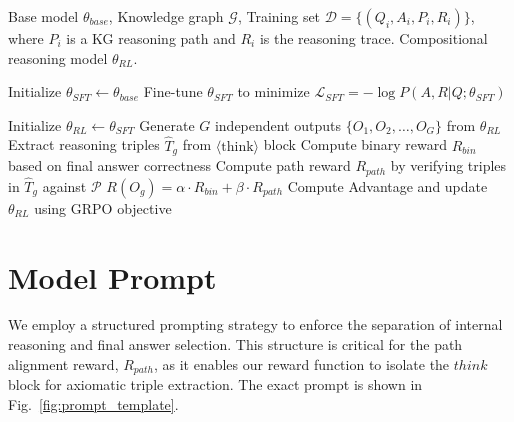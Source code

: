 \documentclass{article}
\theoremstyle{plain}
\theoremstyle{definition}
\theoremstyle{remark}
\begin{document}
\begin{algorithm}[h!]
   \caption{Grounded Compositional Reasoning Pipeline (SFT+RL)}
   \label{alg:pipeline}
\begin{algorithmic}
    Base model $\theta_{base}$, Knowledge graph $\mathcal{G}$, Training set $\mathcal{D} = \{(Q_i, A_i, P_i, R_i)\}$, where $P_i$ is a KG reasoning path and $R_i$ is the reasoning trace.
    Compositional reasoning model $\theta_{RL}$.
   
   \STATE {}
   \STATE Initialize $\theta_{SFT} \leftarrow \theta_{base}$
       \STATE Fine-tune $\theta_{SFT}$ to minimize $\mathcal{L}_{SFT} = -\log P(A, R | Q; \theta_{SFT})$
       \STATE {}
   \ENDFOR
   
   \STATE {}
   \STATE Initialize $\theta_{RL} \leftarrow \theta_{SFT}$
       \STATE Generate $G$ independent outputs $\{O_1, O_2, \dots, O_G\}$ from $\theta_{RL}$
           \STATE Extract reasoning triples $\hat{T}_g$ from $\langle\text{think}\rangle$ block
           \STATE Compute binary reward $R_{bin}$ based on final answer correctness
           \STATE Compute path reward $R_{path}$ by verifying triples in $\hat{T}_g$ against $\mathcal{P}$
           \STATE $R(O_g) = \alpha \cdot R_{bin} + \beta \cdot R_{path}$ 
       \ENDFOR
       \STATE Compute Advantage and update $\theta_{RL}$ using GRPO objective
   \ENDFOR
\end{algorithmic}
\end{algorithm}

\newpage
\section{Model Prompt}
\label{Appendix H}
We employ a structured prompting strategy to enforce the separation of internal reasoning and final answer selection. This structure is critical for the path alignment reward, $R_{path}$, as it enables our reward function to isolate the $think$ block for axiomatic triple extraction. The exact prompt is shown in Fig.~\ref{fig:prompt_template}.
\end{document}
